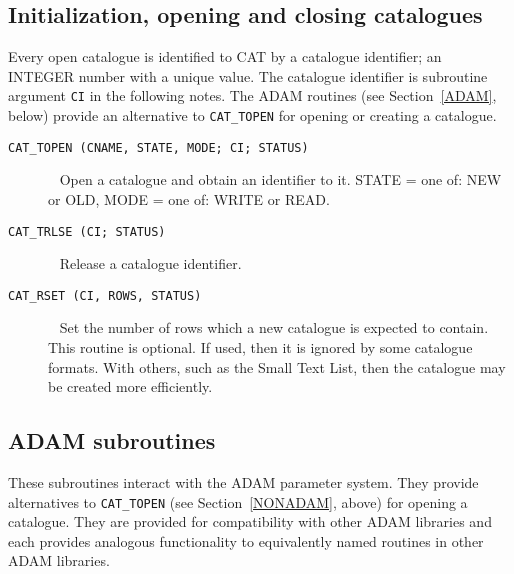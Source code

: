 \documentclass[11pt,twoside]{starlink}
\begin{document}



\subsection{\label{NONADAM}Initialization, opening and closing catalogues}

Every open catalogue is identified to CAT by a catalogue identifier;
an INTEGER number with a unique value. The catalogue identifier is
subroutine argument \texttt{CI} in the following notes. The ADAM routines
(see Section~\ref{ADAM}, below) provide an alternative to \texttt{CAT\_TOPEN} for opening or creating a catalogue.

\begin{description}

  \item[ \texttt{CAT\_TOPEN (CNAME, STATE, MODE; CI; STATUS) } ] ~
  \newline Open a catalogue and obtain an identifier to it.
  \newline STATE = one of: NEW or OLD,
  \newline MODE = one of: WRITE or READ.

  \item[ \texttt{CAT\_TRLSE (CI; STATUS) } ] ~
  \newline Release a catalogue identifier.

  \item[ \texttt{CAT\_RSET (CI, ROWS, STATUS) } ] ~
  \newline Set the number of rows which a new catalogue is expected to
   contain.  This routine is optional.  If used, then it is ignored by
   some catalogue formats.  With others, such as the Small Text List,
   then the catalogue may be created more efficiently.

\end{description}


\subsection{\label{ADAM}ADAM subroutines}

These subroutines interact with the ADAM parameter system. They provide
alternatives to \texttt{CAT\_TOPEN} (see Section~\ref{NONADAM}, above) for
opening a catalogue. They are provided for compatibility with other
ADAM libraries and each provides analogous functionality to equivalently
named routines in other ADAM libraries.
\end{document}
